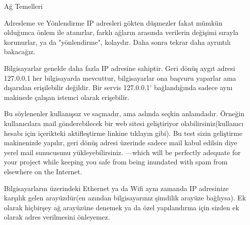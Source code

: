 \begin{section}{Ağ Temelleri}
\begin{subsection}{Adresleme ve Yönlendirme}
IP adresleri gökten düşmezler fakat mümkün olduğunca önlem ile atanırlar, farklı ağların arasında verilerin değişimi sırayla korunurlar, ya da "yönlendirme", kolaydır. Daha sonra tekrar daha ayrıntılı bakacağız. 

Bilgisayarlar genelde daha fazla IP adresine sahiptir. Geri dönüş aygıt adresi 127.0.0.1 her bilgisayarda mevcuttur, bilgisayarlar ona başvuru yaparlar ama dışarıdan erişilebilir değildir. Bir servis 127.0.0.1' bağlandığında sadece aynı makinede çalışan istemci olarak erişebilir.

Bu söylenenler kullanışsız ve saçmadır, ama aslında seçkin anlamdadır. Örneğin kullanıcılara mail gönderebilecek bir web sitesi geliştiriyor olabilirsiniz(kullanıcı hesabı için içerikteki aktifleştirme linkine tıklayın gibi). Bu test sizin geliştirme makinenizde yapılır, geri dönüş adresi üzerinde sadece mail kabul edilsin diye yerel mail sunucusunu yükleyebilirsiniz. —which will be perfectly adequate for your project while keeping you safe from being inundated with spam from elsewhere on the Internet.

Bilgisayarların üzerindeki Ethernet ya da Wifi aynı zamanda IP adresinize karşılık gelen arayüzdür(en azından bilgisayarınız şimdilik arayüze bağlıysa). Ek olarak hiçbirşey  ağ arayüzüne denemek ya da özel yapılandırma için sizden ek olarak adres verilmesini önleyemez.


\end{subsection}
\end{section}
